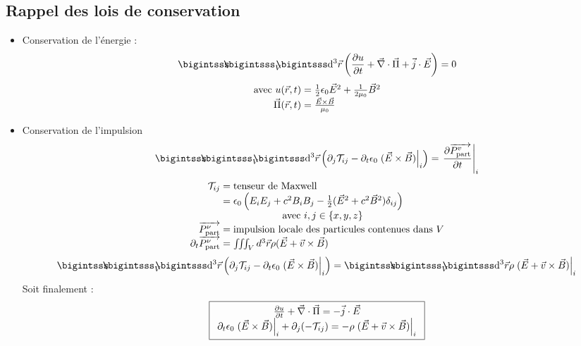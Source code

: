 \subsection{Rappel des lois de conservation}
\begin{itemize}
	\item Conservation de l'énergie :
	$$
		\bigiiintsss \dif^3\vec{r}\left(\frac{\partial u}{\partial t}+\nab\cdot\vec{\Pi}+\vec{j}\cdot\vec{E}\right)=0
	$$
	$$
	\begin{array}{r@{\;}l}
		\text{avec }u(\vec{r},t)&=\frac{1}{2}\epsilon_0\vec{E}^2+\frac{1}{2\mu_0}\vec{B}^2\\
		\vec{\Pi}(\vec{r},t)&=\frac{\vec{E}\times\vec{B}}{\mu_0}
	\end{array}
	$$
	\item Conservation de l'impulsion
	$$
		\bigiiintsss \dif^3\vec{r}\left(\partial_j \mathcal{T}_{ij}-\partial_t\epsilon_0\left.(\vec{E}\times\vec{B})\right|_i\right)=\left.\frac{\partial\overrightarrow{P^v_{\text{part}}}}{\partial t}\right|_i
	$$
	$$
		\begin{array}{r@{\;}l}
			\mathcal{T}_{ij}&=\text{tenseur de Maxwell}\\
				&=\epsilon_0\left(E_iE_j+c^2B_iB_j-\frac{1}{2}(\vec{E}^2+c^2\vec{B}^2)\delta_{ij}\right)\\
				&\text{\hspace{2cm} avec }i,j\in\{x,y,z\}\\
			\overrightarrow{P^\nu_{\text{part}}} &= \text{impulsion locale des particules contenues dans }V\\
			\partial_t\overrightarrow{P^\nu_{\text{part}}}&=\iiint_V d^3\vec{r}\rho(\vec{E}+\vec{v}\times\vec{B})
		\end{array}
	$$
	$$
	\bigiiintsss \dif^3\vec{r}\left(\partial_j\mathcal{T}_{ij}-\partial_t\epsilon_0\left.(\vec{E}\times\vec{B})\right|_i\right) = \bigiiintsss \dif^3\vec{r}\rho\left.(\vec{E}+\vec{v}\times\vec{B})\right|_i
	$$
	Soit finalement :
	$$
	\boxed{
	\begin{array}{c}
		\frac{\partial u}{\partial t}+\vec{\nabla}\cdot\vec{\Pi} = -\vec{j}\cdot\vec{E}\\
		\partial_t\epsilon_0\left.(\vec{E}\times\vec{B})\right|_i+\partial_j(-\mathcal{T}_{ij})=-\rho\left	.(\vec{E}+\vec{v}\times\vec{B})\right|_i
	\end{array}}
	$$
\end{itemize}

